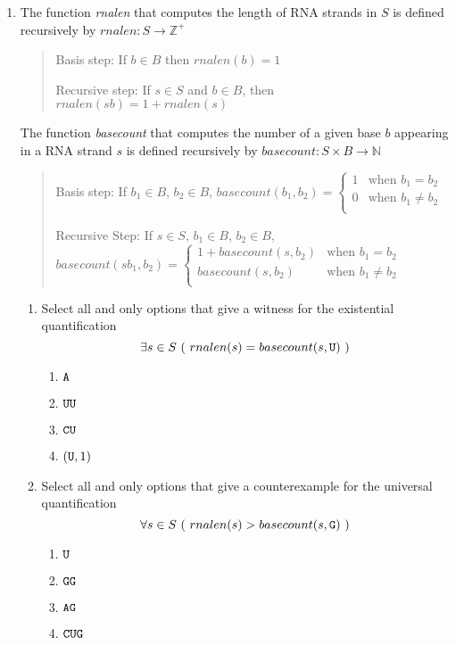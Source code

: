 \documentclass[12pt, oneside]{article}
\begin{document}
\begin{enumerate}
\item  The function \textit{rnalen} that computes the length of RNA strands in $S$ is defined recursively by
$rnalen: S  \to \mathbb{Z}^+$


\begin{quote}
Basis step: If $b \in B$ then $rnalen(b)  = 1$

Recursive step: If $s \in S$ and $b \in B$, then $rnalen(sb)  = 1 + rnalen(s)$
\end{quote}


The function \textit{basecount} that computes the number of a given base $b$ appearing in a RNA strand $s$ is defined recursively by $basecount : S \times B \to\mathbb{N}$

\begin{quote}
Basis step: If  $b_1 \in B$, $b_2 \in B$, $basecount(b_1, b_2) =
        \begin{cases}
            1 & \textrm{when } b_1 = b_2 \\
            0 & \textrm{when } b_1 \neq b_2 \\
        \end{cases}$

Recursive Step: If $s \in S$, $b_1 \in B$, $b_2 \in B$, $basecount(s b_1, b_2) =
        \begin{cases}
            1 + \textit{basecount}(s, b_2) & \textrm{when } b_1 = b_2 \\
            \textit{basecount}(s, b_2) & \textrm{when } b_1 \neq b_2 \\
        \end{cases}$
\end{quote}

\begin{enumerate}
\item Select all and only options that give a witness for the existential quantification
$$\exists s \in S ~(~rnalen(s) = basecount(s,\texttt{U})~)$$
\begin{enumerate}
\item $\texttt{A}$
\item $\texttt{U}\texttt{U}$
\item $\texttt{C}\texttt{U}$
\item $(\texttt{U}, 1)$
\end{enumerate}

\item Select all and only options that give a counterexample for the universal quantification
$$\forall s \in S ~(~rnalen(s) > basecount(s,\texttt{G})~)$$
\begin{enumerate}
\item $\texttt{U}$
\item $\texttt{G}\texttt{G}$
\item $\texttt{A}\texttt{G}$
\item $\texttt{C}\texttt{U}\texttt{G}$
\end{enumerate}


\end{enumerate}
\end{enumerate}
\end{document}

